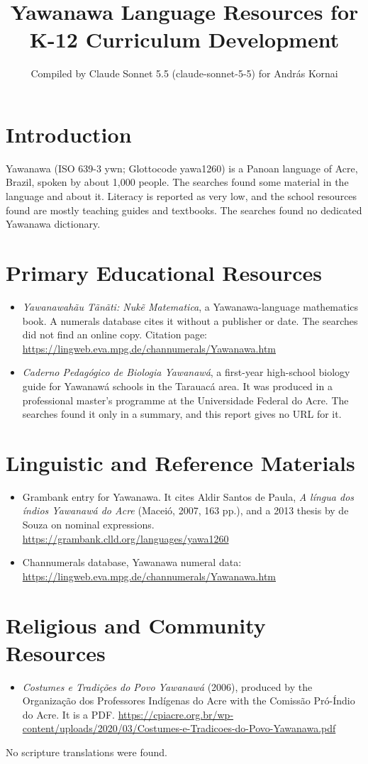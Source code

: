 \documentclass[12pt]{article}
\title{Yawanawa Language Resources for K-12 Curriculum Development}
\author{Compiled by Claude Sonnet 5.5 (claude-sonnet-5-5) for Andr\'as Kornai}
\date{}
\begin{document}
\maketitle

\section{Introduction}
Yawanawa (ISO 639-3 ywn; Glottocode yawa1260) is a Panoan language of Acre, Brazil, spoken by about 1,000 people. The searches found some material in the language and about it. Literacy is reported as very low, and the school resources found are mostly teaching guides and textbooks. The searches found no dedicated Yawanawa dictionary.

\section{Primary Educational Resources}
\begin{itemize}
\item \emph{Yawanawahãu Tãnãti: Nuk\~e Matematica}, a Yawanawa-language mathematics book. A numerals database cites it without a publisher or date. The searches did not find an online copy. Citation page: \url{https://lingweb.eva.mpg.de/channumerals/Yawanawa.htm}
\item \emph{Caderno Pedagógico de Biologia Yawanawá}, a first-year high-school biology guide for Yawanawá schools in the Tarauacá area. It was produced in a professional master's programme at the Universidade Federal do Acre. The searches found it only in a summary, and this report gives no URL for it.
\end{itemize}

\section{Linguistic and Reference Materials}
\begin{itemize}
\item Grambank entry for Yawanawa. It cites Aldir Santos de Paula, \emph{A língua dos índios Yawanawá do Acre} (Maceió, 2007, 163 pp.), and a 2013 thesis by de Souza on nominal expressions. \url{https://grambank.clld.org/languages/yawa1260}
\item Channumerals database, Yawanawa numeral data: \url{https://lingweb.eva.mpg.de/channumerals/Yawanawa.htm}
\end{itemize}

\section{Religious and Community Resources}
\begin{itemize}
\item \emph{Costumes e Tradições do Povo Yawanawá} (2006), produced by the Organização dos Professores Indígenas do Acre with the Comissão Pró-Índio do Acre. It is a PDF. \url{https://cpiacre.org.br/wp-content/uploads/2020/03/Costumes-e-Tradicoes-do-Povo-Yawanawa.pdf}
\end{itemize}
No scripture translations were found.
\end{document}
